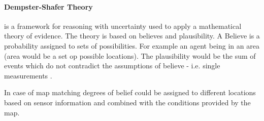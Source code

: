 \paragraph{Dempster-Shafer Theory} is a framework for reasoning with uncertainty used to apply a mathematical theory of evidence. The theory is based on believes and plausibility. A Believe is a probability assigned to sets of possibilities. For example an agent being in an area (area would be a set op possible locations). The plausibility would be the sum of events which do not contradict the assumptions of believe - i.e. single measurements \parencite{reichardt}.

In case of map matching degrees of belief could be assigned to different locations based on sensor information and combined with the conditions provided by the map. 

\pagebreak